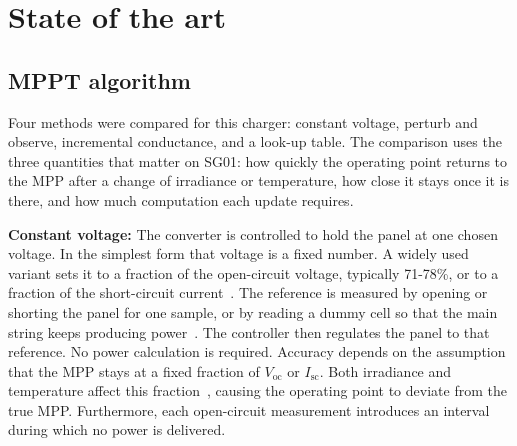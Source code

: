 \documentclass[conference]{IEEEtran}
\begin{document}
\section{State of the art}
\label{sec:soa}

    \subsection{MPPT algorithm}

    Four methods were compared for this charger: constant voltage, perturb and observe, incremental conductance, and a look-up table. The comparison uses the three quantities that matter on SG01: how quickly the operating point returns to the MPP after a change of irradiance or temperature, how close it stays once it is there, and how much computation each update requires.

    \textbf{Constant voltage:}
    The converter is controlled to hold the panel at one chosen voltage. In the simplest form that voltage is a fixed number. A widely used variant sets it to a fraction of the open-circuit voltage, typically 71-78\%, or to a fraction of the short-circuit current~\cite{Comparison_PV_Array_MPPT_Techniques_2007,MPPT_Comparison_techniques}. The reference is measured by opening or shorting the panel for one sample, or by reading a dummy cell so that the main string keeps producing power~\cite{Comparison_PV_Array_MPPT_Techniques_2007}. The controller then regulates the panel to that reference. No power calculation is required. Accuracy depends on the assumption that the MPP stays at a fixed fraction of $V_{\mathrm{oc}}$ or $I_{\mathrm{sc}}$. Both irradiance and temperature affect this fraction~\cite{Comparative_study_MPPT_algorithms_2000}, causing the operating point to deviate from the true MPP. Furthermore, each open-circuit measurement introduces an interval during which no power is delivered.
\end{document}
